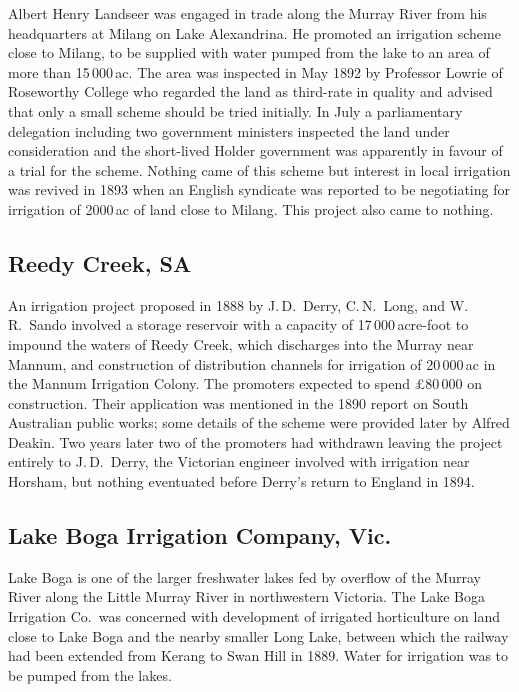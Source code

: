 Albert Henry Landseer was engaged in trade along the Murray River from
his headquarters at Milang on Lake Alexandrina.  He promoted an
irrigation scheme close to Milang, to be supplied with water pumped
from the lake to an area of more than 15\,000\,ac.  The area was
inspected in May 1892 by Professor Lowrie of Roseworthy College who
regarded the land as third-rate in quality and advised that only a
small scheme should be tried initially.  In July a parliamentary
delegation including two government ministers inspected the land under
consideration and the short-lived Holder government was apparently in
favour of a trial for the scheme.  Nothing came of this scheme but
interest in local irrigation was revived in 1893 when an English
syndicate was reported to be negotiating for irrigation of 2000\,ac of
land close to Milang.  This project also came to
nothing.

\subsection*{Reedy Creek, SA}

An irrigation project proposed in 1888 by J.\,D.~Derry, C.\,N.~Long,
and W.\,R.~Sando involved a storage reservoir with a capacity of
17\,000\,acre-foot to impound the waters of Reedy Creek, which
discharges into the Murray near Mannum, and construction of
distribution channels for irrigation of 20\,000\,ac in the Mannum
Irrigation Colony.  The promoters expected to spend \pounds80\,000 on
construction.  Their application was mentioned in the 1890 report on
South Australian public works; some details of the scheme were
provided later by Alfred Deakin.  Two years later two of the promoters
had withdrawn leaving the project entirely to J.\,D.~Derry, the
Victorian engineer involved with irrigation near Horsham, but nothing
eventuated before Derry's return to England in 1894.

\subsection*{Lake Boga Irrigation Company, Vic.}

Lake Boga is one of the larger freshwater lakes fed by overflow of the
Murray River along the Little Murray River in northwestern Victoria.
The Lake Boga Irrigation Co.\ was concerned with development of
irrigated horticulture on land close to Lake Boga and the nearby
smaller Long Lake, between which the railway had been extended from
Kerang to Swan Hill in 1889.  Water for irrigation was to be pumped
from the lakes.

